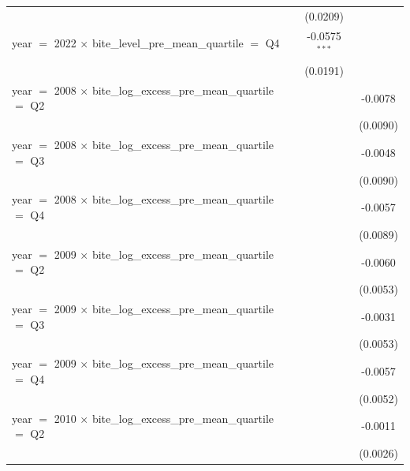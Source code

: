 \begin{tabular}{lcc}
                                                                              & (0.0209)                 &   \\   
   year $=$ 2022 $\times$ bite\_level\_pre\_mean\_quartile $=$ Q4             & -0.0575$^{***}$          &   \\   
                                                                              & (0.0191)                 &   \\   
   year $=$ 2008 $\times$ bite\_log\_excess\_pre\_mean\_quartile $=$ Q2       &                          & -0.0078\\   
                                                                              &                          & (0.0090)\\   
   year $=$ 2008 $\times$ bite\_log\_excess\_pre\_mean\_quartile $=$ Q3       &                          & -0.0048\\   
                                                                              &                          & (0.0090)\\   
   year $=$ 2008 $\times$ bite\_log\_excess\_pre\_mean\_quartile $=$ Q4       &                          & -0.0057\\   
                                                                              &                          & (0.0089)\\   
   year $=$ 2009 $\times$ bite\_log\_excess\_pre\_mean\_quartile $=$ Q2       &                          & -0.0060\\   
                                                                              &                          & (0.0053)\\   
   year $=$ 2009 $\times$ bite\_log\_excess\_pre\_mean\_quartile $=$ Q3       &                          & -0.0031\\   
                                                                              &                          & (0.0053)\\   
   year $=$ 2009 $\times$ bite\_log\_excess\_pre\_mean\_quartile $=$ Q4       &                          & -0.0057\\   
                                                                              &                          & (0.0052)\\   
   year $=$ 2010 $\times$ bite\_log\_excess\_pre\_mean\_quartile $=$ Q2       &                          & -0.0011\\   
                                                                              &                          & (0.0026)\\   

\end{tabular}
